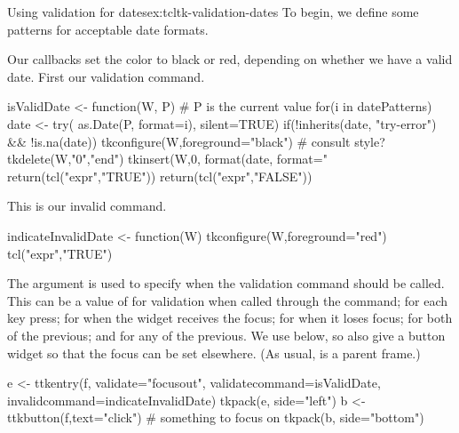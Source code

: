\begin{example}{Using validation for dates}{ex:tcltk-validation-dates}
To begin,  we define some patterns for acceptable date formats.
\begin{Schunk}
\end{Schunk}

Our callbacks set the color to black or red, depending on whether we
have a valid date. First our validation command.
\begin{Schunk}
\begin{Sinput}
 isValidDate <- function(W, P) { # P is the current value
   for(i in datePatterns) {
     date <- try( as.Date(P, format=i), silent=TRUE)
     if(!inherits(date, "try-error") && !is.na(date)) {
       tkconfigure(W,foreground="black") #  consult style?
       tkdelete(W,"0","end")
       tkinsert(W,0, format(date, format="%
       return(tcl("expr","TRUE"))        
     } 
   }
   return(tcl("expr","FALSE"))
 }
\end{Sinput}
\end{Schunk}

This is our invalid command.
\begin{Schunk}
\begin{Sinput}
 indicateInvalidDate <- function(W) {
   tkconfigure(W,foreground="red")
   tcl("expr","TRUE")
 }
\end{Sinput}
\end{Schunk}


The  argument is used to specify when the
validation command should be called. This can be a value of
 for validation when called through the 
command;  for each key press;  for when the
widget receives the focus;  for when it loses focus;
 for both of the previous; and  for any of the
previous. We use  below, so also give a button widget
so that the focus can be set elsewhere. (As usual,  is a
parent frame.)
\begin{Schunk}
\begin{Sinput}
 e <- ttkentry(f, validate="focusout",
               validatecommand=isValidDate,
               invalidcommand=indicateInvalidDate)
 tkpack(e, side="left")
 b <- ttkbutton(f,text="click")          # something to focus on
 tkpack(b, side="bottom")
\end{Sinput}
\end{Schunk}
              
\end{example}

